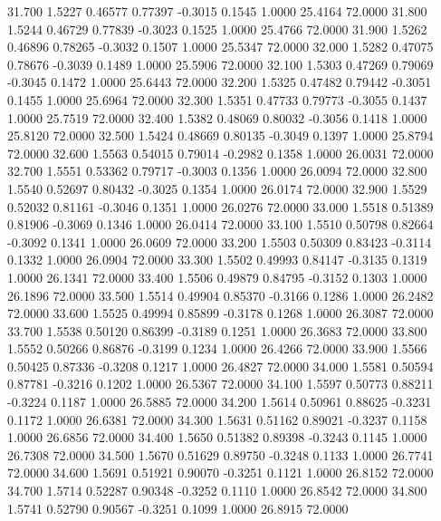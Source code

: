   31.700   1.5227   0.46577   0.77397  -0.3015   0.1545   1.0000  25.4164  72.0000
  31.800   1.5244   0.46729   0.77839  -0.3023   0.1525   1.0000  25.4766  72.0000
  31.900   1.5262   0.46896   0.78265  -0.3032   0.1507   1.0000  25.5347  72.0000
  32.000   1.5282   0.47075   0.78676  -0.3039   0.1489   1.0000  25.5906  72.0000
  32.100   1.5303   0.47269   0.79069  -0.3045   0.1472   1.0000  25.6443  72.0000
  32.200   1.5325   0.47482   0.79442  -0.3051   0.1455   1.0000  25.6964  72.0000
  32.300   1.5351   0.47733   0.79773  -0.3055   0.1437   1.0000  25.7519  72.0000
  32.400   1.5382   0.48069   0.80032  -0.3056   0.1418   1.0000  25.8120  72.0000
  32.500   1.5424   0.48669   0.80135  -0.3049   0.1397   1.0000  25.8794  72.0000
  32.600   1.5563   0.54015   0.79014  -0.2982   0.1358   1.0000  26.0031  72.0000
  32.700   1.5551   0.53362   0.79717  -0.3003   0.1356   1.0000  26.0094  72.0000
  32.800   1.5540   0.52697   0.80432  -0.3025   0.1354   1.0000  26.0174  72.0000
  32.900   1.5529   0.52032   0.81161  -0.3046   0.1351   1.0000  26.0276  72.0000
  33.000   1.5518   0.51389   0.81906  -0.3069   0.1346   1.0000  26.0414  72.0000
  33.100   1.5510   0.50798   0.82664  -0.3092   0.1341   1.0000  26.0609  72.0000
  33.200   1.5503   0.50309   0.83423  -0.3114   0.1332   1.0000  26.0904  72.0000
  33.300   1.5502   0.49993   0.84147  -0.3135   0.1319   1.0000  26.1341  72.0000
  33.400   1.5506   0.49879   0.84795  -0.3152   0.1303   1.0000  26.1896  72.0000
  33.500   1.5514   0.49904   0.85370  -0.3166   0.1286   1.0000  26.2482  72.0000
  33.600   1.5525   0.49994   0.85899  -0.3178   0.1268   1.0000  26.3087  72.0000
  33.700   1.5538   0.50120   0.86399  -0.3189   0.1251   1.0000  26.3683  72.0000
  33.800   1.5552   0.50266   0.86876  -0.3199   0.1234   1.0000  26.4266  72.0000
  33.900   1.5566   0.50425   0.87336  -0.3208   0.1217   1.0000  26.4827  72.0000
  34.000   1.5581   0.50594   0.87781  -0.3216   0.1202   1.0000  26.5367  72.0000
  34.100   1.5597   0.50773   0.88211  -0.3224   0.1187   1.0000  26.5885  72.0000
  34.200   1.5614   0.50961   0.88625  -0.3231   0.1172   1.0000  26.6381  72.0000
  34.300   1.5631   0.51162   0.89021  -0.3237   0.1158   1.0000  26.6856  72.0000
  34.400   1.5650   0.51382   0.89398  -0.3243   0.1145   1.0000  26.7308  72.0000
  34.500   1.5670   0.51629   0.89750  -0.3248   0.1133   1.0000  26.7741  72.0000
  34.600   1.5691   0.51921   0.90070  -0.3251   0.1121   1.0000  26.8152  72.0000
  34.700   1.5714   0.52287   0.90348  -0.3252   0.1110   1.0000  26.8542  72.0000
  34.800   1.5741   0.52790   0.90567  -0.3251   0.1099   1.0000  26.8915  72.0000
